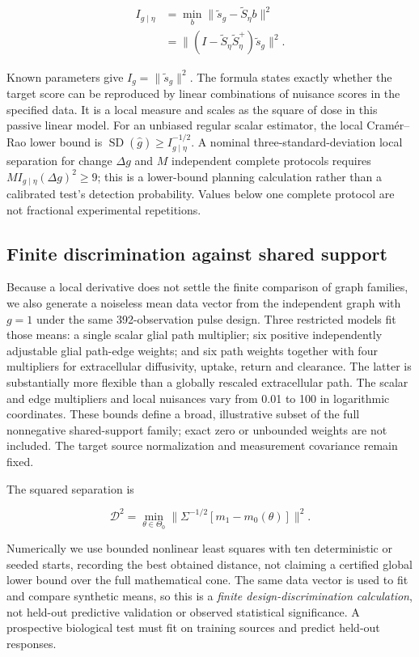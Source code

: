 \documentclass[
  11pt,
]{article}
\begin{document}
\[\begin{aligned}
I_{g\mid\eta}&=\min_b\|\widetilde s_g-\widetilde S_\eta b\|^2\\
&=\|(I-\widetilde S_\eta\widetilde S_\eta^+)\widetilde s_g\|^2.
\end{aligned}\]

Known parameters give \(I_g=\|\widetilde s_g\|^2\). The formula states
exactly whether the target score can be reproduced by linear
combinations of nuisance scores in the specified data. It is a local
measure and scales as the square of dose in this passive linear model.
For an unbiased regular scalar estimator, the local Cramér--Rao lower
bound is \(\operatorname{SD}(\widehat g)\geq I_{g\mid\eta}^{-1/2}\). A
nominal three-standard-deviation local separation for change
\(\Delta g\) and \(M\) independent complete protocols requires
\(M I_{g\mid\eta}(\Delta g)^2\geq9\); this is a lower-bound planning
calculation rather than a calibrated test's detection probability.
Values below one complete protocol are not fractional experimental
repetitions.

\subsection{Finite discrimination against shared
support}\label{finite-discrimination-against-shared-support}

Because a local derivative does not settle the finite comparison of
graph families, we also generate a noiseless mean data vector from the
independent graph with \(g=1\) under the same 392-observation pulse
design. Three restricted models fit those means: a single scalar glial
path multiplier; six positive independently adjustable glial path-edge
weights; and six path weights together with four multipliers for
extracellular diffusivity, uptake, return and clearance. The latter is
substantially more flexible than a globally rescaled extracellular path.
The scalar and edge multipliers and local nuisances vary from 0.01 to
100 in logarithmic coordinates. These bounds define a broad,
illustrative subset of the full nonnegative shared-support family; exact
zero or unbounded weights are not included. The target source
normalization and measurement covariance remain fixed.

The squared separation is

\[\mathcal D^2=\min_{\theta\in\Theta_0}\|\Sigma^{-1/2}[m_1-m_0(\theta)]\|^2.\]

Numerically we use bounded nonlinear least squares with ten
deterministic or seeded starts, recording the best obtained distance,
not claiming a certified global lower bound over the full mathematical
cone. The same data vector is used to fit and compare synthetic means,
so this is a \emph{finite design-discrimination calculation}, not
held-out predictive validation or observed statistical significance. A
prospective biological test must fit on training sources and predict
held-out responses.
\end{document}
